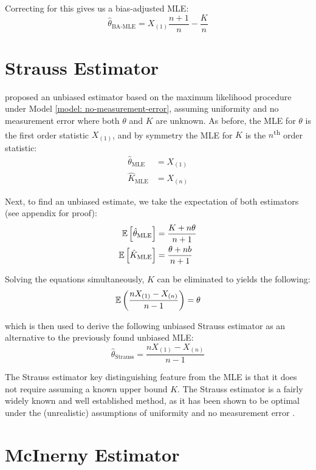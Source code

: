 Correcting for this gives us a bias-adjusted MLE:
\begin{equation}\label{eq:ba-mle}
    \hat\theta_{\text{BA-MLE}} = X_{(1)} \frac{n+1}{n} - \frac{K}{n}
\end{equation}

\section{Strauss Estimator}

\citet{Strauss1989} proposed an unbiased estimator based on the maximum likelihood procedure under Model \ref{model: no-measurement-error}, assuming uniformity and no measurement error where both $\theta$ and $K$ are unknown. As before, the MLE for $\theta$ is the first order statistic $X_{(1)}$, and by symmetry the MLE for $K$ is the $n$\textsuperscript{th} order statistic:
\begin{align*}
    \hat\theta_{\text{MLE}} &= X_{(1)} \\
    \hat K_{\text{MLE}} &= X_{(n)}
\end{align*}

Next, to find an unbiased estimate, we take the expectation of both estimators (see appendix for proof):
\begin{align*}
    \mathbb{E} \left[ \hat\theta_{\text{MLE}} \right] &= \frac{K + n\theta}{n+1} \\
    \mathbb{E} \left[ \hat K_{\text{MLE}} \right]  &= \frac{\theta + nb}{n+1}
\end{align*}

Solving the equations simultaneously, $K$ can be eliminated to yields the following:
\[
\mathbb{E} \left( \frac{nX_{(1)} - X_{(n)}}{n-1} \right) = \theta
\]

which is then used to derive the following unbiased Strauss estimator as an alternative to the previously found unbiased MLE:
\begin{equation}\label{eq:strauss}
\hat\theta_{\text{Strauss}} = \frac{n X_{(1)} - X_{(n)}}{n-1}
\end{equation}

The Strauss estimator key distinguishing feature from the MLE is that it does not require assuming a known upper bound $K$. The Strauss estimator is a fairly widely known and well established method, as it has been shown to be optimal under the (unrealistic) assumptions of uniformity and no measurement error \cite{wang_chudzicki_everson_2009}.

\section{McInerny Estimator}

